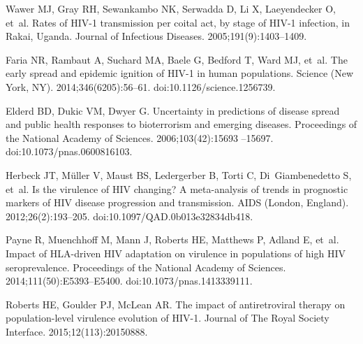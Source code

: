 \documentclass[10pt,letterpaper]{article}
\begin{document}
\begin{thebibliography}{10}
Wawer MJ, Gray RH, Sewankambo NK, Serwadda D, Li X, Laeyendecker O, et~al.
\newblock Rates of {HIV}-1 transmission per coital act, by stage of {HIV}-1
  infection, in {Rakai}, {Uganda}.
\newblock Journal of Infectious Diseases. 2005;191(9):1403--1409.

Faria NR, Rambaut A, Suchard MA, Baele G, Bedford T, Ward MJ, et~al.
\newblock The early spread and epidemic ignition of {HIV}-1 in human
  populations.
\newblock Science (New York, NY). 2014;346(6205):56--61.
\newblock doi:{10.1126/science.1256739}.

Elderd BD, Dukic VM, Dwyer G.
\newblock Uncertainty in predictions of disease spread and public health
  responses to bioterrorism and emerging diseases.
\newblock Proceedings of the National Academy of Sciences. 2006;103(42):15693
  --15697.
\newblock doi:{10.1073/pnas.0600816103}.

Herbeck JT, Müller V, Maust BS, Ledergerber B, Torti C, Di~Giambenedetto S,
  et~al.
\newblock Is the virulence of {HIV} changing? {A} meta-analysis of trends in
  prognostic markers of {HIV} disease progression and transmission.
\newblock AIDS (London, England). 2012;26(2):193--205.
\newblock doi:{10.1097/QAD.0b013e32834db418}.

Payne R, Muenchhoff M, Mann J, Roberts HE, Matthews P, Adland E, et~al.
\newblock Impact of {HLA}-driven {HIV} adaptation on virulence in populations
  of high {HIV} seroprevalence.
\newblock Proceedings of the National Academy of Sciences.
  2014;111(50):E5393--E5400.
\newblock doi:{10.1073/pnas.1413339111}.

Roberts HE, Goulder PJ, McLean AR.
\newblock The impact of antiretroviral therapy on population-level virulence
  evolution of {HIV}-1.
\newblock Journal of The Royal Society Interface. 2015;12(113):20150888.

\end{thebibliography}
\end{document}
